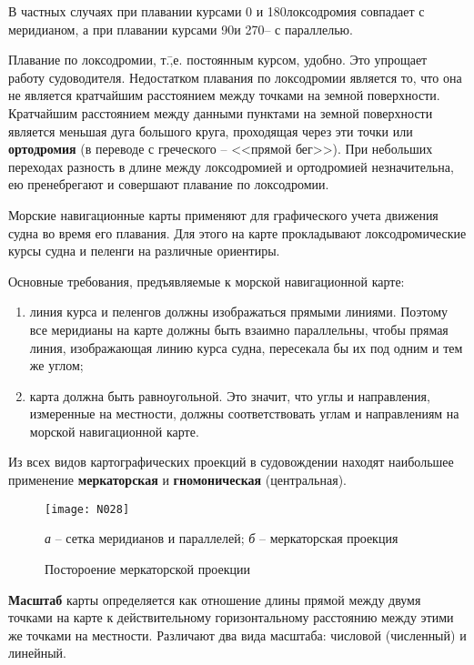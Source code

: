 В частных случаях при плавании курсами 0 и 180\gr локсодромия совпадает с меридианом, а при плавании курсами 90\gr и 270\gr \--- с параллелью. 

Плавание по локсодромии, т.\=,е. постоянным курсом, удобно. Это упрощает работу судоводителя. Недостатком плавания по локсодромии является то, что она не является кратчайшим расстоянием между точками на земной поверхности. Кратчайшим расстоянием между данными пунктами на земной поверхности является меньшая дуга большого круга, проходящая через эти точки или \textbf{ортодромия} (в переводе с греческого \--- <<прямой бег>>). При небольших переходах разность в длине между локсодромией и ортодромией незначительна, ею пренебрегают и совершают плавание по локсодромии. 

Морские навигационные карты применяют для графического учета движения судна во время его плавания. Для этого на карте прокладывают локсодромические курсы судна и пеленги на различные ориентиры. 

Основные требования, предъявляемые к морской навигационной карте: 

\begin{enumerate}
\item линия курса и пеленгов должны изображаться прямыми линиями. Поэтому все меридианы на карте должны быть взаимно параллельны, чтобы прямая линия, изображающая линию курса судна, пересекала бы их под одним и тем же углом; 
\item карта должна быть равноугольной. Это значит, что углы и направления, измеренные на местности, должны соответствовать углам и направлениям на морской навигационной карте. 
\end{enumerate}

Из всех видов картографических проекций в судовождении находят наибольшее применение \textbf{меркаторская} и \textbf{гномоническая} (центральная). 

\begin{figure*}[htb]
  \centering{}
  \texttt{[image: N028]}
  \caption{Постороение меркаторской проекции}
  \label{fig:N28}
  \small
  \centering{}
  \textit{а} \--- сетка меридианов и параллелей; \textit{б} \--- меркаторская проекция
\end{figure*}

\textbf{Масштаб} карты определяется как отношение длины прямой между двумя точками на карте к действительному горизонтальному расстоянию между этими же точками на местности. Различают два вида масштаба: числовой (численный) и линейный.
 

